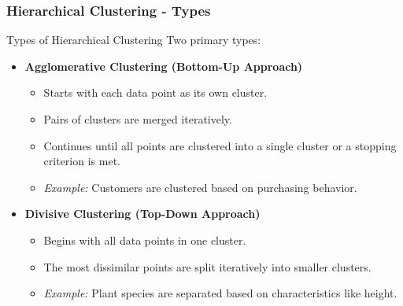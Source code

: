 \documentclass[aspectratio=169]{beamer}
\begin{document}
\begin{frame}[fragile]
    \frametitle{Hierarchical Clustering - Types}
    \begin{block}{Types of Hierarchical Clustering}
        Two primary types:
        \begin{itemize}
            \item \textbf{Agglomerative Clustering (Bottom-Up Approach)}
            \begin{itemize}
                \item Starts with each data point as its own cluster.
                \item Pairs of clusters are merged iteratively.
                \item Continues until all points are clustered into a single cluster or a stopping criterion is met.
                \item \textit{Example:} Customers are clustered based on purchasing behavior.
            \end{itemize}
            
            \item \textbf{Divisive Clustering (Top-Down Approach)}
            \begin{itemize}
                \item Begins with all data points in one cluster.
                \item The most dissimilar points are split iteratively into smaller clusters.
                \item \textit{Example:} Plant species are separated based on characteristics like height.
            \end{itemize}
        \end{itemize}
    \end{block}
\end{frame}
\end{document}
